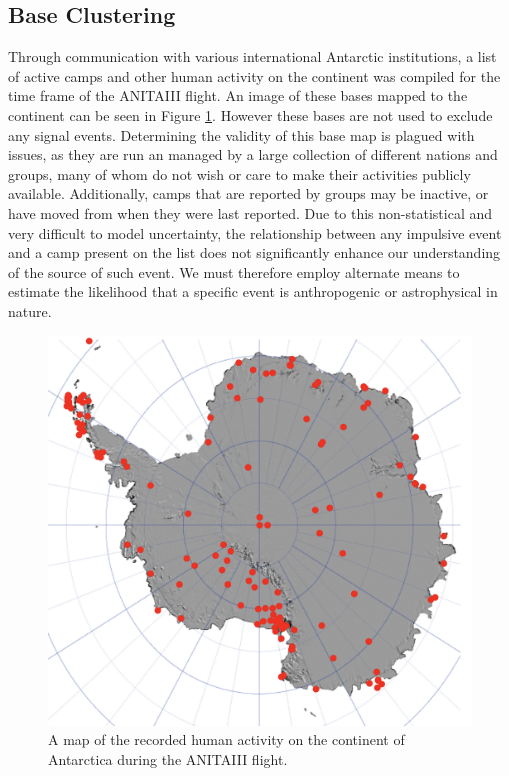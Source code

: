 	\subsection{Base Clustering}
		Through communication with various international Antarctic institutions, a list of active camps and other human activity on the continent was compiled for the time frame of the ANITAIII flight.  An image of these bases mapped to the continent can be seen in Figure \ref{fig:BaseMap}.  However these bases are not used to exclude any signal events.  Determining the validity of this base map is plagued with issues, as they are run an managed by a large collection of different nations and groups, many of whom do not wish or care to make their activities publicly available.  Additionally, camps that are reported by groups may be inactive, or have moved from when they were last reported.  Due to this non-statistical and very difficult to model uncertainty, the relationship between any impulsive event and a camp present on the list does not significantly enhance our understanding of the source of such event.  We must therefore employ alternate means to estimate the likelihood that a specific event is anthropogenic or astrophysical in nature.
		
\begin{figure}
	\includegraphics[width=\textwidth]{figures/BaseMap}
	\caption{A map of the recorded human activity on the continent of Antarctica during the ANITAIII flight.}
	\label{fig:BaseMap}
\end{figure}	
	
